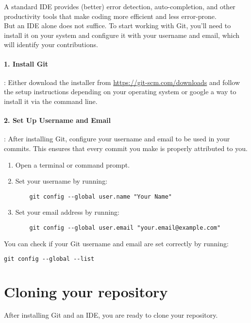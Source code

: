 A standard IDE provides (better) error detection, auto-completion, and other productivity tools that make coding more efficient and less error-prone. \\ \newline
But an IDE alone does not suffice.
To start working with Git, you'll need to install it on your system and configure it with your username and email, which will identify your contributions.

\paragraph{1. Install Git}: Either download the installer from
\href{https://git-scm.com}{https://git-scm.com/downloads} and follow the setup instructions depending on your operating system or google a way to install it via the command line.

\paragraph{2. Set Up Username and Email}: After installing Git, configure your username and email to be used in your
commits.
This ensures that every commit you make is properly attributed to you.
\begin{enumerate}
    \item Open a terminal or command prompt.
    \item Set your username by running:
    \begin{verbatim}
    git config --global user.name "Your Name"
    \end{verbatim}
    \item Set your email address by running:
    \begin{verbatim}
    git config --global user.email "your.email@example.com"
    \end{verbatim}
\end{enumerate}
\item You can check if your Git username and email are set correctly by running:
\begin{verbatim}
git config --global --list
\end{verbatim}

\section{Cloning your repository} \label{sec:cloning} 
After installing Git and an IDE, you are ready to clone your repository.
